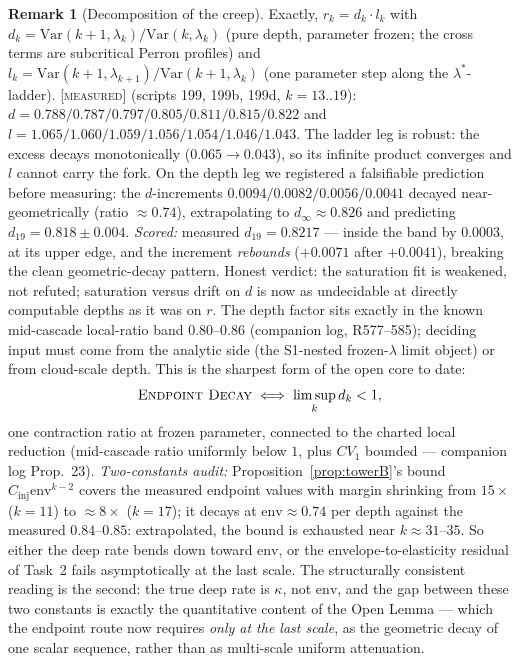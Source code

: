 \documentclass[11pt]{article}
\theoremstyle{definition}
\newtheorem{remark}[theorem]{Remark}
\newcommand{\MEASURED}{\textup{[\textsc{measured}]}}
\newcommand{\Var}{\mathrm{Var}}
\newcommand{\lam}{\lambda}
\begin{document}
\begin{remark}[Decomposition of the creep]\label{rem:decomp}
Exactly,
$r_k = d_k \cdot l_k$ with
$d_k = \Var(k{+}1, \lam_k)/\Var(k, \lam_k)$ (pure depth, parameter
frozen; the cross terms are subcritical Perron profiles) and
$l_k = \Var(k{+}1, \lam_{k+1})/\Var(k{+}1, \lam_k)$ (one parameter step
along the $\lam^*$-ladder). \MEASURED{} (scripts 199, 199b, 199d,
$k = 13..19$): $d = 0.788/0.787/0.797/0.805/0.811/0.815/0.822$ and
$l = 1.065/1.060/1.059/1.056/1.054/1.046/1.043$. The ladder leg is
robust: the excess decays monotonically ($0.065 \to 0.043$), so its
infinite product converges and $l$ cannot carry the fork. On the depth
leg we registered a falsifiable prediction before measuring: the
$d$-increments $0.0094/0.0082/0.0056/0.0041$ decayed near-geometrically
(ratio $\approx 0.74$), extrapolating to $d_\infty \approx 0.826$ and
predicting $d_{19} = 0.818 \pm 0.004$. \emph{Scored:} measured
$d_{19} = 0.8217$ --- inside the band by $0.0003$, at its upper edge,
and the increment \emph{rebounds} ($+0.0071$ after $+0.0041$), breaking
the clean geometric-decay pattern. Honest verdict: the saturation fit
is weakened, not refuted; saturation versus drift on $d$ is now as
undecidable at directly computable depths as it was on $r$. The depth
factor sits exactly in the known mid-cascade local-ratio band
$0.80$--$0.86$ (companion log, R577--585); deciding input must come
from the analytic side (the S1-nested frozen-$\lam$ limit object) or
from cloud-scale depth. This is the sharpest form of the open core
to date:
\[
\textsc{Endpoint Decay} \iff \limsup_k d_k < 1,
\]
one contraction ratio at frozen parameter, connected to the charted
local reduction (mid-cascade ratio uniformly below $1$, plus $CV_1$
bounded --- companion log Prop.~23).
\emph{Two-constants audit:} Proposition~\ref{prop:towerB}'s bound
$C_{\mathrm{inj}}\mathrm{env}^{k-2}$ covers the measured endpoint values
with margin shrinking from $15\times$ ($k{=}11$) to $\approx 8\times$
($k{=}17$); it decays at $\mathrm{env} \approx 0.74$ per depth against
the measured $0.84$--$0.85$: extrapolated, the bound is exhausted near
$k \approx 31$--$35$. So either the deep rate bends down toward
$\mathrm{env}$, or the envelope-to-elasticity residual of Task~2 fails
asymptotically at the last scale. The structurally consistent reading is
the second: the true deep rate is $\kappa$, not $\mathrm{env}$, and the
gap between these two constants is exactly the quantitative content of
the Open Lemma --- which the endpoint route now requires \emph{only at
the last scale}, as the geometric decay of one scalar sequence, rather
than as multi-scale uniform attenuation.
\end{remark}
\end{document}

